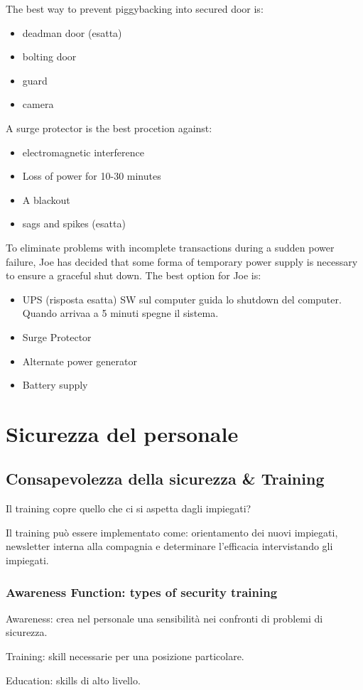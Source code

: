 The best way to prevent piggybacking into secured door is:
\begin{itemize}
\item deadman door (esatta)
\item bolting door
\item guard
\item camera
\end{itemize}


A surge protector is the best procetion against:
\begin{itemize}
\item electromagnetic interference
\item Loss of power for 10-30 minutes
\item A blackout
\item sags and spikes (esatta)
\end{itemize}



To eliminate problems with incomplete transactions during a sudden power 
failure, Joe has decided that some forma of temporary power supply is necessary 
to ensure a graceful shut down. The best option for Joe is:

\begin{itemize}
\item UPS (risposta esatta) %
SW sul computer guida lo shutdown del computer. Quando arrivaa a 5 minuti spegne 
il sistema.
\item Surge Protector 
\item Alternate power generator
\item Battery supply
\end{itemize}

\section{Sicurezza del personale}

\subsection{Consapevolezza della sicurezza \& Training}

Il training copre quello che ci si aspetta dagli impiegati?

Il training può essere implementato come: orientamento dei nuovi impiegati, 
newsletter interna alla compagnia e determinare l'efficacia intervistando gli 
impiegati.


\subsubsection{Awareness Function: types of security training}

Awareness: crea nel personale una sensibilità nei confronti di problemi di 
sicurezza.

Training: skill necessarie per una posizione particolare.

Education: skills di alto livello.

